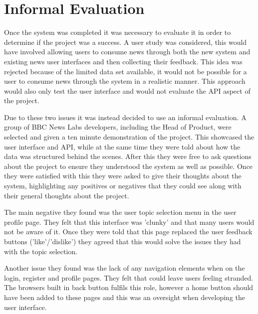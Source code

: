 \documentclass[12pt,titlepage]{article}
\begin{document}
\section{Informal Evaluation}


%

  Once the system was completed it was necessary to evaluate it in order to
  determine if the project was a success. A user study was considered, this would
  have involved allowing users to consume news through both the new system and
  existing news user interfaces and then collecting their feedback. This idea
  was rejected because of the limited data set available, it would not be
  possible for a user to consume news through the system in a realistic manner.
  This approach would also only test the user interface and would not evaluate
  the API aspect of the project.

  Due to these two issues it was instead decided to use an informal evaluation.
  A group of BBC News Labs developers, including the Head of Product, were
  selected and given a ten minute demonstration of the project. This showcased
  the user interface and API, while at the same time they were told about how
  the data was structured behind the scenes. After this they were free to ask
  questions about the project to ensure they understood the system as well as
  possible. Once they were satisfied with this they were asked to give their
  thoughts about the system, highlighting any positives or negatives that they
  could see along with their general thoughts about the project.

  The main negative they found was the user topic selection menu in the user
  profile page. They felt that this interface was 'clunky' and that many users
  would not be aware of it. Once they were told that this page replaced the user
  feedback buttons ('like'/'dislike') they agreed that this would solve the
  issues they had with the topic selection.

  Another issue they found was the lack of any navigation elements when on the
  login, register and profile pages. They felt that could leave users feeling
  stranded. The browsers built in back button fulfils this role, however a home
  button should have been added to these pages and this was an oversight when
  developing the user interface.
\end{document}
